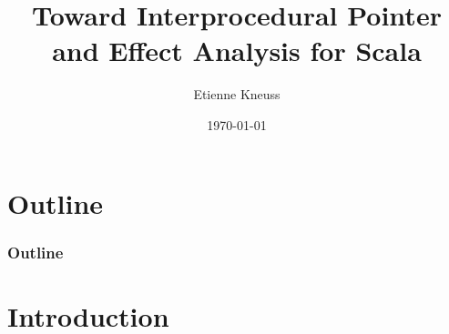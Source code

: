 \documentclass[hyperref={pdfpagelabels=false}]{beamer}
\begin{document}
\title{Toward Interprocedural Pointer and Effect Analysis for Scala}
\author{Etienne Kneuss}
\date{\today}

\nocite{*}


\begin{frame}
    \titlepage
\end{frame}

\section*{Outline}
\begin{frame}
    \frametitle{Outline}
    \tableofcontents
\end{frame}

\section{Introduction}
\end{document}
